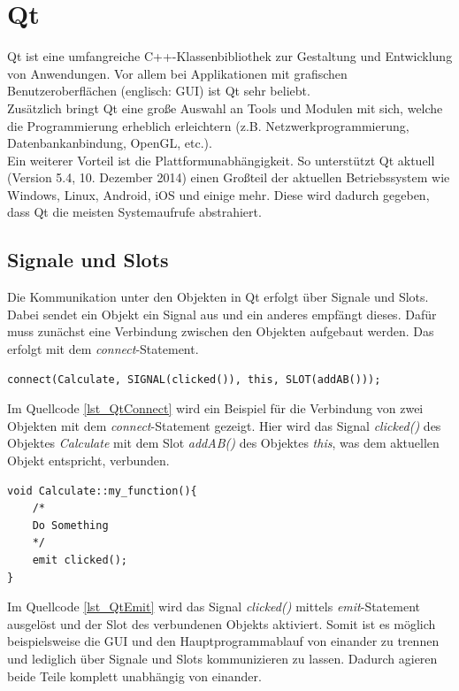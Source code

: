 \section{Qt}
\label{section_Qt}
Qt \cite{QtProject} ist eine umfangreiche C++-Klassenbibliothek zur Gestaltung und Entwicklung von Anwendungen. Vor allem bei Applikationen mit grafischen Benutzeroberflächen (englisch: \ac{GUI}) ist Qt sehr beliebt. \\
Zusätzlich bringt Qt eine große Auswahl an Tools und Modulen mit sich, welche die Programmierung erheblich erleichtern (z.B. Netzwerkprogrammierung, Datenbankanbindung, OpenGL, etc.). \\
Ein weiterer Vorteil ist die Plattformunabhängigkeit. So unterstützt Qt aktuell (Version 5.4, 10. Dezember 2014) einen Großteil der aktuellen Betriebssystem wie Windows, Linux, Android, iOS und einige mehr. Diese wird dadurch gegeben, dass Qt die meisten Systemaufrufe abstrahiert.

\subsection{Signale und Slots}
\label{QtSignaleSlots}
Die Kommunikation unter den Objekten in Qt erfolgt über Signale und Slots. Dabei sendet ein Objekt ein Signal aus und ein anderes empfängt dieses. Dafür muss zunächst eine Verbindung zwischen den Objekten aufgebaut werden. Das erfolgt mit dem \textit{connect}-Statement.\\

\begin{lstlisting}[caption={Qt \textit{connect}-Statement},label=lst_QtConnect]
connect(Calculate, SIGNAL(clicked()), this, SLOT(addAB()));
\end{lstlisting}

Im Quellcode \ref{lst_QtConnect} wird ein Beispiel für die Verbindung von zwei Objekten mit dem \textit{connect}-Statement gezeigt. Hier wird das Signal \textit{clicked()} des Objektes \textit{Calculate} mit dem Slot \textit{addAB()} des Objektes \textit{this}, was dem aktuellen Objekt entspricht, verbunden. \\

\begin{lstlisting}[caption={Qt \textit{emit}-Statement},label=lst_QtEmit]
void Calculate::my_function(){
	/*
	Do Something
	*/
	emit clicked();	
}
\end{lstlisting}

Im Quellcode \ref{lst_QtEmit} wird das Signal \textit{clicked()} mittels \textit{emit}-Statement ausgelöst und der Slot des verbundenen Objekts aktiviert. Somit ist es möglich beispielsweise die GUI und den Hauptprogrammablauf von einander zu trennen und lediglich über Signale und Slots kommunizieren zu lassen. Dadurch agieren beide Teile komplett unabhängig von einander.

